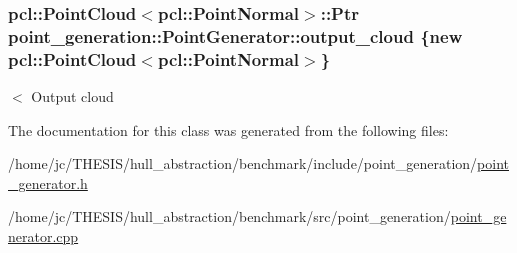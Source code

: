 \subsubsection[{\texorpdfstring{output\+\_\+cloud}{output_cloud}}]{\setlength{\rightskip}{0pt plus 5cm}pcl\+::\+Point\+Cloud$<$pcl\+::\+Point\+Normal$>$\+::Ptr point\+\_\+generation\+::\+Point\+Generator\+::output\+\_\+cloud \{new pcl\+::\+Point\+Cloud$<$pcl\+::\+Point\+Normal$>$\}\hspace{0.3cm}{\ttfamily [private]}}\hypertarget{classpoint__generation_1_1_point_generator_a131d34ab830d99611b438b169fba40ad}{}\label{classpoint__generation_1_1_point_generator_a131d34ab830d99611b438b169fba40ad}
$<$ Output cloud 

The documentation for this class was generated from the following files\+:\begin{DoxyCompactItemize}
\item 
/home/jc/\+T\+H\+E\+S\+I\+S/hull\+\_\+abstraction/benchmark/include/point\+\_\+generation/\hyperlink{point__generator_8h}{point\+\_\+generator.\+h}\item 
/home/jc/\+T\+H\+E\+S\+I\+S/hull\+\_\+abstraction/benchmark/src/point\+\_\+generation/\hyperlink{point__generator_8cpp}{point\+\_\+generator.\+cpp}\end{DoxyCompactItemize}
